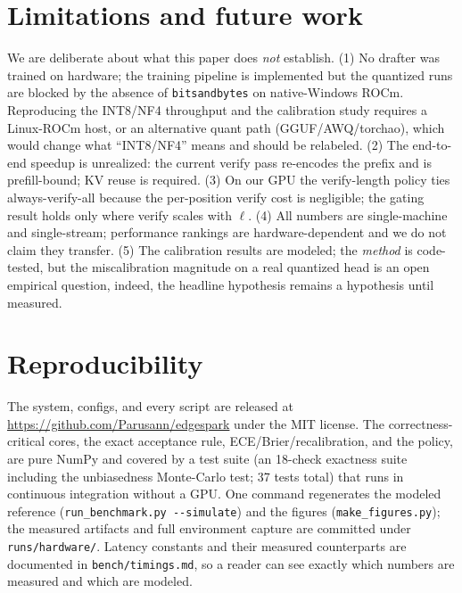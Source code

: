 \documentclass[11pt]{article}
\theoremstyle{plain}
\theoremstyle{definition}
\begin{document}
\section{Limitations and future work}
We are deliberate about what this paper does \emph{not} establish. (1) No drafter
was trained on hardware; the training pipeline is implemented but the quantized
runs are blocked by the absence of \texttt{bitsandbytes} on native-Windows ROCm.
Reproducing the INT8/NF4 throughput and the calibration study requires a
Linux-ROCm host, or an alternative quant path (GGUF/AWQ/torchao), which would
change what ``INT8/NF4'' means and should be relabeled. (2) The end-to-end speedup
is unrealized: the current verify pass re-encodes the prefix and is prefill-bound;
KV reuse is required. (3) On our GPU the verify-length policy ties
always-verify-all because the per-position verify cost is negligible; the gating
result holds only where verify scales with $\ell$. (4) All numbers are
single-machine and single-stream; performance rankings are hardware-dependent and
we do not claim they transfer. (5) The calibration results are modeled; the
\emph{method} is code-tested, but the miscalibration magnitude on a real quantized
head is an open empirical question, indeed, the headline hypothesis remains a
hypothesis until measured.

\section{Reproducibility}
The system, configs, and every script are released at
\url{https://github.com/Parusann/edgespark} under the MIT license. The
correctness-critical cores, the exact acceptance rule, ECE/Brier/recalibration,
and the policy, are pure NumPy and covered by a test suite (an 18-check exactness
suite including the unbiasedness Monte-Carlo test; 37 tests total) that runs in
continuous integration without a GPU. One command regenerates the modeled
reference (\texttt{run\_benchmark.py -{}-simulate}) and the figures
(\texttt{make\_figures.py}); the measured artifacts and full environment capture
are committed under \texttt{runs/hardware/}. Latency constants and their measured
counterparts are documented in \texttt{bench/timings.md}, so a reader can see
exactly which numbers are measured and which are modeled.
\end{document}

